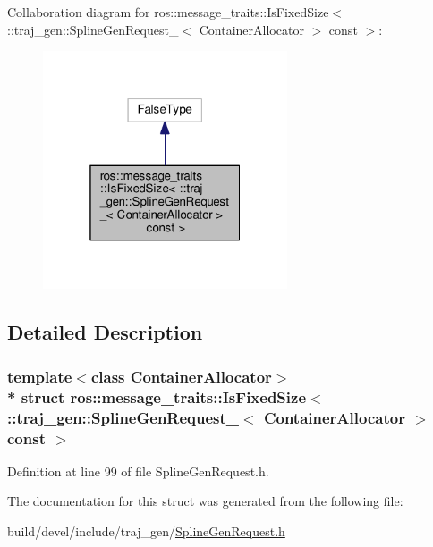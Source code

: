 Collaboration diagram for ros\+:\+:message\+\_\+traits\+:\+:Is\+Fixed\+Size$<$ \+:\+:traj\+\_\+gen\+:\+:Spline\+Gen\+Request\+\_\+$<$ Container\+Allocator $>$ const $>$\+:
\nopagebreak
\begin{figure}[H]
\begin{center}
\leavevmode
\includegraphics[width=205pt]{structros_1_1message__traits_1_1_is_fixed_size_3_01_1_1traj__gen_1_1_spline_gen_request___3_01_c930820b086f8eab35380ecf895fcf257}
\end{center}
\end{figure}


\subsection{Detailed Description}
\subsubsection*{template$<$class Container\+Allocator$>$\\*
struct ros\+::message\+\_\+traits\+::\+Is\+Fixed\+Size$<$ \+::traj\+\_\+gen\+::\+Spline\+Gen\+Request\+\_\+$<$ Container\+Allocator $>$ const  $>$}



Definition at line 99 of file Spline\+Gen\+Request.\+h.



The documentation for this struct was generated from the following file\+:\begin{DoxyCompactItemize}
\item 
build/devel/include/traj\+\_\+gen/\hyperlink{_spline_gen_request_8h}{Spline\+Gen\+Request.\+h}\end{DoxyCompactItemize}
